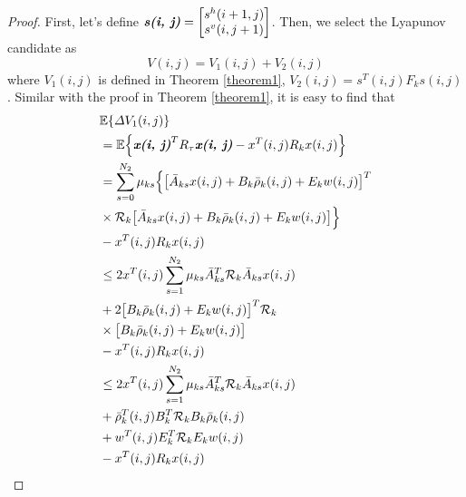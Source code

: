 \documentclass[conference]{IEEEtran}
\begin{document}
\begin{proof} 
	First, let's define $\emph{\textbf{s(i, j)}} = \begin{bmatrix}
	s^{h}(i+1,j)\\ s^{v}(i,j+1)
	\end{bmatrix}$.  Then, we select the Lyapunov candidate as
	\begin{equation}
		V(i,j)=V_{1}(i,j)+V_{2}(i,j)
	\end{equation}
	where $V_{1}(i,j)$ is defined in Theorem \ref{theorem1}, $V_{2}(i,j)=s^{T}(i,j)F_{k}s(i,j)$. Similar with the proof in Theorem \ref{theorem1}, it is easy to find that
	\begin{equation}
		\begin{split}
			&\mathbb{E}\{\varDelta V_{1}(i,j) \}\\
			&=\mathbb{E}\Big\{\emph{\textbf{x(i, j)}}^{T}R_{\tau}\emph{\textbf{x(i, j)}} - x^{T}(i,j)R_{k}x(i,j)\Big\}\\
			&=  \sum_{s=0}^{N_{2}}\mu_{ks}\Big\{\big[\bar{A}_{ks}x(i,j)+B_{k}\bar{\rho}_{k}(i,j)+E_{k}w(i,j)\big]^{T}\\
			&\times\mathcal{R}_{k} \big[ \bar{A}_{ks}x(i,j)+B_{k}\bar{\rho}_{k}(i,j)+E_{k}w(i,j)\big]\Big\}\\
			&-x^{T}(i,j)R_{k}x(i,j)\\
			&\leq 2x^{T}(i,j)\sum_{s=1}^{N_{2}}\mu_{ks}\bar{A}^{T}_{ks}\mathcal{R}_{k}\bar{A}_{ks}x(i,j) \\
			&+2\big[B_{k}\bar{\rho}_{k}(i,j)+E_{k}w(i,j)\big]^{T}\mathcal{R}_{k}\\
			&\times\big[B_{k}\bar{\rho}_{k}(i,j)+E_{k}w(i,j)\big]\\
			&-x^{T}(i,j)R_{k}x(i,j)\\
			&\leq 2x^{T}(i,j)\sum_{s=1}^{N_{2}}\mu_{ks}\bar{A}^{T}_{ks}\mathcal{R}_{k}\bar{A}_{ks}x(i,j) \\
			&+ \bar{\rho}^{T}_{k}(i,j)B^{T}_{k}\mathcal{R}_{k}B_{k}\bar{\rho}_{k}(i,j)\\
			&+w^{T}(i,j)E^{T}_{k}\mathcal{R}_{k}E_{k}w(i,j)\\
			&-x^{T}(i,j)R_{k}x(i,j)

\end{split}
\end{equation}
\end{proof}
\end{document}
